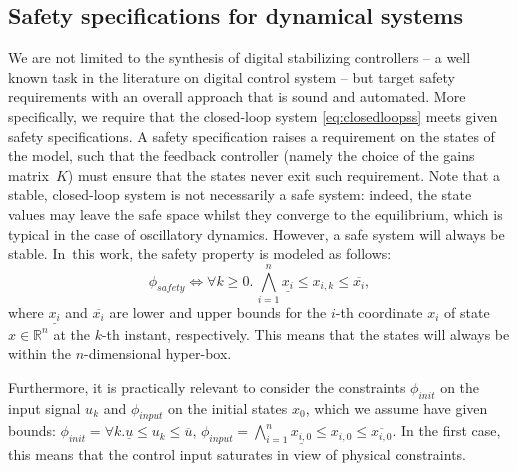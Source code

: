 \documentclass[runningheads,a4paper]{llncs}
\newcommand{\addtodo}[1]{{\color{red} TODO: #1}}
\begin{document}
\subsection{Safety specifications for dynamical systems}
\label{ssec:safety}

We are not limited to the synthesis of digital stabilizing controllers -- a
well known task in the literature on digital control system -- but target
safety requirements with an overall approach that is sound and automated. 
More specifically, we require that the closed-loop system
\eqref{eq:closedloopss} meets given safety specifications.  A safety
specification raises a requirement on the states of the model, such that the
feedback controller (namely the choice of the gains matrix~$K$) must ensure
that the states never exit such requirement.  Note that a stable,
closed-loop system is not necessarily a safe system: indeed, the state
values may leave the safe space whilst they converge to the equilibrium,
which is typical in the case of oscillatory dynamics.  However, a safe
system will always be stable.  In~this work, the safety property 
is modeled as follows:
%
\begin{equation}
\label{eq:safetyliteral}
\phi_\mathit{safety}\iff \forall k\ge 0.\, \bigwedge_{i=1}^{n}{\underline{x_{i}} \leq x_{i,k} \leq \overline{x_{i}}},
\end{equation}
%
%
where $\underline{x_{i}}$ and $\overline{x_{i}}$ are lower and upper bounds
for the $i$-th coordinate $x_{i}$ of state $x\in \mathbb R^n$ at the $k$-th
instant, respectively.  This means that the states will always be within the
$n$-dimensional hyper-box.

Furthermore, it is practically relevant to consider the 
constraints $\phi_\mathit{init}$ on the input
signal $u_{k}$ and $\phi_\mathit{input}$ on the initial states $x_0$,
which we assume have given bounds:
$\phi_\mathit{init} = {\forall k.\underline{u} \leq u_{k} \leq \overline{u}} $, 
$\phi_\mathit{input} = \bigwedge_{i=1}^{n} \underline{x_{i,0}} \leq x_{i,0} \leq \overline{x_{i,0}}.$
In the first case, this means that the control input saturates in view of
physical constraints.

\end{document}
